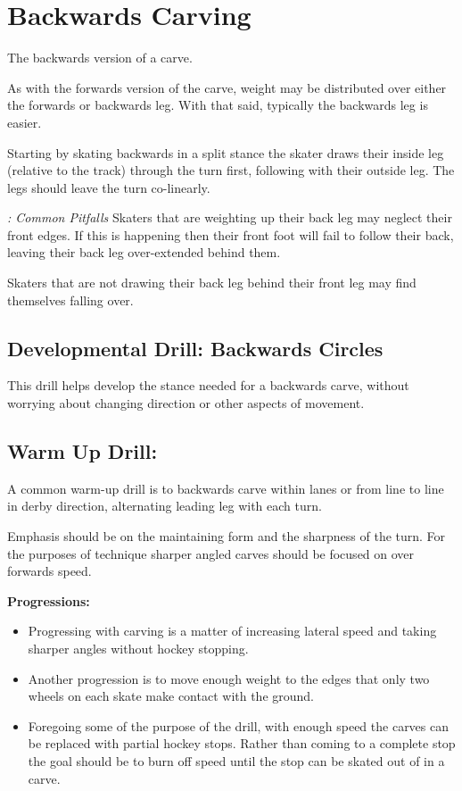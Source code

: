 
\section{Backwards Carving}

\label{sec:sticky/backwards_carves}

The backwards version of a carve.

As with the forwards version of the carve, weight may be distributed over either the forwards or backwards leg. With that said, typically the backwards leg is easier.  

Starting by skating backwards in a split stance the skater draws their inside leg (relative to the track) through the turn first, following with their outside leg.   
The legs should leave the turn co-linearly. 


{\it: Common Pitfalls}
Skaters that are weighting up their back leg may neglect their front edges. If this is happening then their front foot will fail to follow their back, leaving their back leg over-extended behind them.   


Skaters that are not drawing their back leg behind their front leg may find themselves falling over.  


\subsection*{Developmental Drill: Backwards Circles}

This drill helps develop the stance needed for a backwards carve, without worrying about changing direction or other aspects of movement.  


\subsection*{Warm Up Drill:}
A common warm-up drill is to backwards carve within lanes or from line to line in derby direction, alternating leading leg with each turn.    

Emphasis should be on the maintaining form and the sharpness of the turn. For the purposes of technique sharper angled carves should be focused on over forwards speed. 


{\bf Progressions:}

\begin{itemize}
    \item Progressing with carving is a matter of increasing lateral speed and taking sharper angles without hockey stopping. 
    \item  Another progression is to move enough weight to the edges that only two wheels on each skate make contact with the ground.
    \item Foregoing some of the purpose of the drill, with enough speed the carves can be replaced with partial hockey stops. Rather than coming to a complete stop the goal should be to burn off speed until the stop can be skated out of in a carve.    
\end{itemize}


